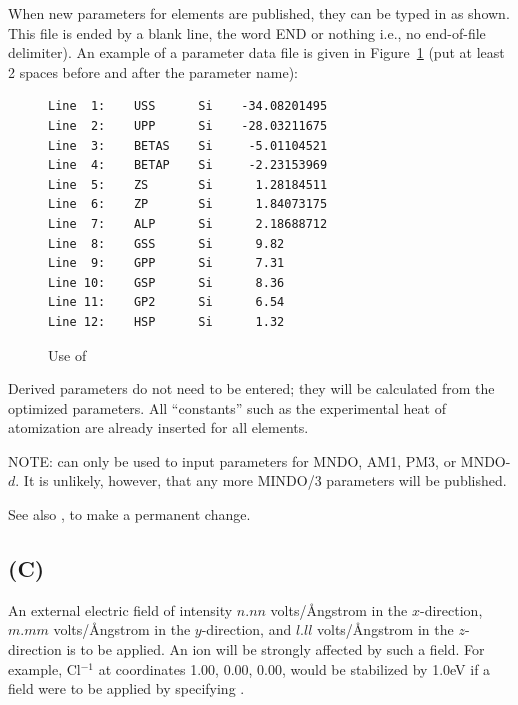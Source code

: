 When new parameters for elements are published, they can be typed in
as  shown.   This file is ended by a blank line, the word END or nothing
i.e., no end-of-file delimiter).  An example  of  a  parameter  data  file
is given in Figure~\ref{external_fig}  (put at least
2 spaces before and after the parameter name):
\begin{figure}
\begin{makeimage}
\end{makeimage}
\begin{verbatim}
Line  1:    USS      Si    -34.08201495
Line  2:    UPP      Si    -28.03211675
Line  3:    BETAS    Si     -5.01104521
Line  4:    BETAP    Si     -2.23153969
Line  5:    ZS       Si      1.28184511
Line  6:    ZP       Si      1.84073175
Line  7:    ALP      Si      2.18688712
Line  8:    GSS      Si      9.82
Line  9:    GPP      Si      7.31
Line 10:    GSP      Si      8.36
Line 11:    GP2      Si      6.54
Line 12:    HSP      Si      1.32
\end{verbatim}
\caption{\label{external_fig}Use of }
\end{figure}

Derived parameters do not need to be entered; they will be calculated
from  the optimized parameters.  All ``constants'' such as the experimental
heat of atomization are already inserted for all elements.

NOTE:   can only be used to input parameters for MNDO,  AM1,
PM3, or MNDO-$d$.   It is unlikely, however, that any more MINDO/3 parameters will
be published.

See also , to make a permanent change.

\subsection*{ (C)}
An external electric field of intensity $n.nn$ volts/\AA ngstrom in the
$x$-direction, $m.mm$ volts/\AA ngstrom in the $y$-direction,  and $l.ll$
volts/\AA ngstrom in the  $z$-direction is to be applied.  An ion will be
strongly affected by such a field.  For example, Cl$^{-1}$ at coordinates
1.00, 0.00, 0.00, would be stabilized by 1.0eV if a field were to be
applied by specifying .


